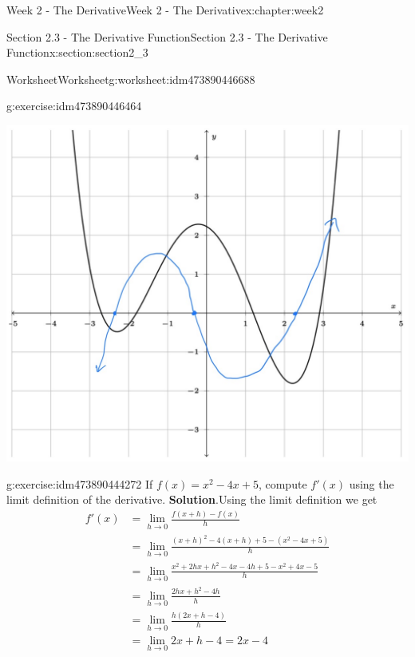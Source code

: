 \documentclass[oneside,10pt,]{book}
\newcommand{\blocktitlefont}{\relax}
\numberwithin{equation}{section}
\newlength{\qrsize}
\newlength{\previewwidth}
\newcommand{\amp}{&}
\begin{document}
\begin{chapterptx}{Week 2 - The Derivative}{}{Week 2 - The Derivative}{}{}{x:chapter:week2}
\begin{sectionptx}{Section 2.3 - The Derivative Function}{}{Section 2.3 - The Derivative Function}{}{}{x:section:section2_3}
\begin{worksheet-subsection}{Worksheet}{}{Worksheet}{}{}{g:worksheet:idm473890446688}
\begin{divisionexercise}{1}{}{}{g:exercise:idm473890446464}
\begin{image}{0}{1}{0}
\includegraphics[width=\linewidth]{images/Math140WkshtDerivative2G2.JPG}
\end{image}%
\end{divisionexercise}%
\begin{divisionexercise}{2}{}{}{g:exercise:idm473890444272}%
If \(f(x) = x^2 - 4x+5\), compute \(f'(x)\) using the limit definition of the derivative.%
\textbf{\blocktitlefont Solution}.\hypertarget{g:solution:idm473890444144}{}\quad{}Using the limit definition we get%
\begin{align*}
f'(x) \amp = \lim_{h\to 0} \frac{f(x+h)-f(x)}{h} \\
\amp = \lim_{h\to 0} \frac{(x+h)^2-4(x+h)+5-(x^2-4x+5)}{h}\\
\amp = \lim_{h\to 0} \frac{x^2+2hx+h^2-4x-4h+5-x^2+4x-5}{h}\\
\amp = \lim_{h\to 0} \frac{2hx+h^2-4h}{h} \\
\amp = \lim_{h\to 0} \frac{h(2x+h-4)}{h}\\
\amp = \lim_{h\to 0} 2x+h-4 = 2x-4 
\end{align*}
\end{divisionexercise}%
\end{worksheet-subsection}
\restoregeometry
\setlength{\qrsize}{9em}
\setlength{\previewwidth}{\linewidth}
\addtolength{\previewwidth}{-\qrsize}
\begin{tcbraster}[raster columns=2, raster column skip=1pt, raster halign=center, raster force size=false, raster left skip=0pt, raster right skip=0pt]%
\begin{tcolorbox}[previewstyle, width=\previewwidth]%

\end{tcolorbox}
\end{tcbraster}
\end{sectionptx}
\end{chapterptx}
\end{document}
